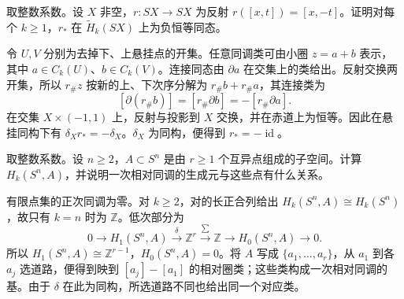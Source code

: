 \begin{exercise}\label{g2:ex:suspension-reflection-sign}
	取整数系数。设 \(X\) 非空，\(r:SX\to SX\) 为反射 \(r([x,t])=[x,-t]\)。证明对每个 \(k\ge1\)，\(r_*\) 在 \(\widetilde H_k(SX)\) 上为负恒等同态。
\end{exercise}
\begin{solution}
	令 \(U,V\) 分别为去掉下、上悬挂点的开集。任意同调类可由小圈 \(z=a+b\) 表示，其中 \(a\in C_k(U)\)、\(b\in C_k(V)\)。连接同态由 \(\partial a\) 在交集上的类给出。反射交换两开集，所以 \(r_\#z\) 按新的上、下次序分解为 \(r_\#b+r_\#a\)，其连接类为
	\[
		[\partial(r_\#b)]=[r_\#\partial b]=-[r_\#\partial a].
	\]
	在交集 \(X\times(-1,1)\) 上，反射与投影到 \(X\) 交换，并在赤道上为恒等。因此在悬挂同构下有 \(\delta_Xr_*=-\delta_X\)。\(\delta_X\) 为同构，便得到 \(r_*=-\operatorname{id}\)。
\end{solution}

\begin{exercise}\label{g2:ex:sphere-marked-points}
	取整数系数。设 \(n\ge2\)，\(A\subset S^n\) 是由 \(r\ge1\) 个互异点组成的子空间。计算 \(H_k(S^n,A)\)，并说明一次相对同调的生成元与这些点有什么关系。
\end{exercise}
\begin{solution}
	有限点集的正次同调为零。对 \(k\ge2\)，对的长正合列给出 \(H_k(S^n,A)\cong H_k(S^n)\)，故只有 \(k=n\) 时为 \(\mathbb Z\)。低次部分为
	\[
		0\longrightarrow H_1(S^n,A)\xrightarrow{\delta}
		\mathbb Z^r\xrightarrow{\sum}\mathbb Z
		\longrightarrow H_0(S^n,A)\longrightarrow0.
	\]
	所以 \(H_1(S^n,A)\cong\mathbb Z^{r-1}\)，\(H_0(S^n,A)=0\)。将 \(A\) 写成 \(\{a_1,\ldots,a_r\}\)，从 \(a_1\) 到各 \(a_j\) 选道路，便得到映到 \([a_j]-[a_1]\) 的相对圈类；这些类构成一次相对同调的基。由于 \(\delta\) 在此为同构，所选道路不同也给出同一个对应类。
\end{solution}
